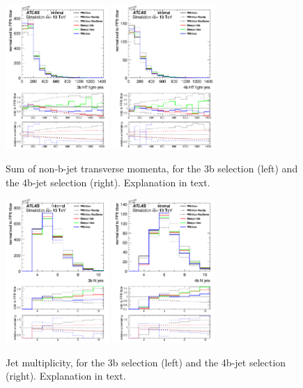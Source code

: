 \begin{figure}[!htb]
\centering
\includegraphics[width=0.35\textwidth]{Plots/ttbb/hisgenHTljets_4j3t__div}
\includegraphics[width=0.35\textwidth]{Plots/ttbb/hisgenHTljets_4j4t__div}
  \caption{Sum of non-b-jet transverse momenta, for the 3b selection (left) and the 4b-jet selection (right). Explanation in text. \label{ttbb:HTljets}}
\end{figure}

\begin{figure}[!htb]
\centering
\includegraphics[width=0.35\textwidth]{Plots/ttbb/hisgenNjets_4j3t__div}
\includegraphics[width=0.35\textwidth]{Plots/ttbb/hisgenNjets_4j4t__div}
  \caption{Jet multiplicity, for the 3b selection (left) and the 4b-jet selection (right). Explanation in text. \label{ttbb:Njets}}
\end{figure}